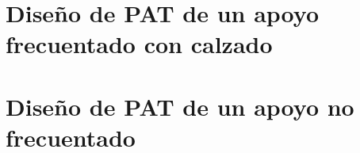 


\section{Diseño de PAT de un apoyo frecuentado con calzado}
\label{sec:plano-pat-frecuentado}

\section{Diseño de PAT de un apoyo no frecuentado}
\label{sec:plano-pat-nofrecuentado}


